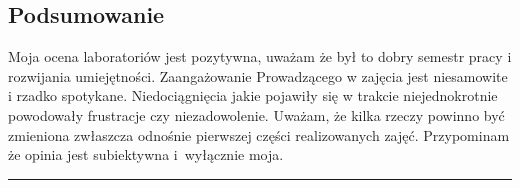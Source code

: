 \documentclass[a4paper,11pt]{article}
\newcommand{\linia}{\rule{\linewidth}{0.4mm}}
\begin{document}
\subsection{Podsumowanie}
Moja ocena laboratoriów jest pozytywna, uważam że był to dobry semestr pracy i rozwijania umiejętności. Zaangażowanie Prowadzącego w zajęcia jest niesamowite i rzadko spotykane. Niedociągnięcia jakie pojawiły się w trakcie niejednokrotnie powodowały frustracje czy niezadowolenie. Uważam, że kilka rzeczy powinno być zmieniona zwłaszcza odnośnie pierwszej części realizowanych zajęć. Przypominam że opinia jest subiektywna i~wyłącznie moja.

\noindent\linia
\end{document}
